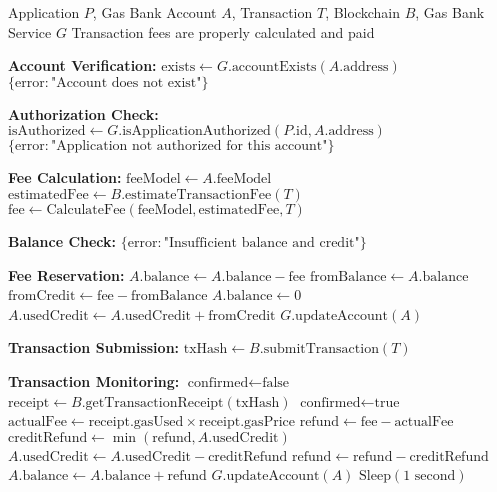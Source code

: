 \begin{protocol}
\label{prot:fee-payment}
\begin{algorithmic}[1]
\Require Application $P$, Gas Bank Account $A$, Transaction $T$, Blockchain $B$, Gas Bank Service $G$
\Ensure Transaction fees are properly calculated and paid

\State \textbf{Account Verification:}
\State $\text{exists} \gets G.\text{accountExists}(A.\text{address})$
    \State \Return $\{\text{error}: \text{"Account does not exist"}\}$
\EndIf

\State \textbf{Authorization Check:}
\State $\text{isAuthorized} \gets G.\text{isApplicationAuthorized}(P.\text{id}, A.\text{address})$
    \State \Return $\{\text{error}: \text{"Application not authorized for this account"}\}$
\EndIf

\State \textbf{Fee Calculation:}
\State $\text{feeModel} \gets A.\text{feeModel}$
\State $\text{estimatedFee} \gets B.\text{estimateTransactionFee}(T)$
\State $\text{fee} \gets \text{CalculateFee}(\text{feeModel}, \text{estimatedFee}, T)$

\State \textbf{Balance Check:}
    \State \Return $\{\text{error}: \text{"Insufficient balance and credit"}\}$
\EndIf

\State \textbf{Fee Reservation:}
    \State $A.\text{balance} \gets A.\text{balance} - \text{fee}$
\Else
    \State $\text{fromBalance} \gets A.\text{balance}$
    \State $\text{fromCredit} \gets \text{fee} - \text{fromBalance}$
    \State $A.\text{balance} \gets 0$
    \State $A.\text{usedCredit} \gets A.\text{usedCredit} + \text{fromCredit}$
\EndIf
\State $G.\text{updateAccount}(A)$

\State \textbf{Transaction Submission:}
\State $\text{txHash} \gets B.\text{submitTransaction}(T)$

\State \textbf{Transaction Monitoring:}
\State $\text{confirmed} \gets \text{false}$
    \State $\text{receipt} \gets B.\text{getTransactionReceipt}(\text{txHash})$
        \State $\text{confirmed} \gets \text{true}$
        \State $\text{actualFee} \gets \text{receipt}.\text{gasUsed} \times \text{receipt}.\text{gasPrice}$
            \State $\text{refund} \gets \text{fee} - \text{actualFee}$
                \State $\text{creditRefund} \gets \min(\text{refund}, A.\text{usedCredit})$
                \State $A.\text{usedCredit} \gets A.\text{usedCredit} - \text{creditRefund}$
                \State $\text{refund} \gets \text{refund} - \text{creditRefund}$
            \EndIf
                \State $A.\text{balance} \gets A.\text{balance} + \text{refund}$
            \EndIf
            \State $G.\text{updateAccount}(A)$
        \EndIf
    \EndIf
        \State $\text{Sleep}(1\text{ second})$
    \EndIf
\EndWhile


\end{algorithmic}
\end{protocol}
